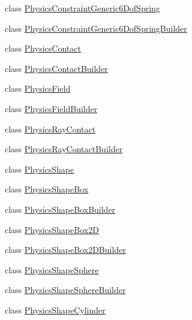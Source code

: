 \begin{DoxyCompactItemize}
\item 
class \mbox{\hyperlink{classnjli_1_1_world_factory_af32c447e4cf588410ecc1a6106157f9a}{Physics\+Constraint\+Generic6\+Dof\+Spring}}
\item 
class \mbox{\hyperlink{classnjli_1_1_world_factory_a933373e183ecd046f268e1b69038a02e}{Physics\+Constraint\+Generic6\+Dof\+Spring\+Builder}}
\item 
class \mbox{\hyperlink{classnjli_1_1_world_factory_af82a8eac76d39e47206a7eb1917e53f7}{Physics\+Contact}}
\item 
class \mbox{\hyperlink{classnjli_1_1_world_factory_aa61adc7648e4c29d071f44e17614316c}{Physics\+Contact\+Builder}}
\item 
class \mbox{\hyperlink{classnjli_1_1_world_factory_a8216afecc63791c1d19b902232c886b6}{Physics\+Field}}
\item 
class \mbox{\hyperlink{classnjli_1_1_world_factory_a09c097cb47fc1f3568d827cf0536b6ee}{Physics\+Field\+Builder}}
\item 
class \mbox{\hyperlink{classnjli_1_1_world_factory_a2fb3e6c99ae1c2204a36f0e83adab75e}{Physics\+Ray\+Contact}}
\item 
class \mbox{\hyperlink{classnjli_1_1_world_factory_a51efff0009aa2c9c621486a310037129}{Physics\+Ray\+Contact\+Builder}}
\item 
class \mbox{\hyperlink{classnjli_1_1_world_factory_a726223aef7972f289c4a01ccfd23d5ee}{Physics\+Shape}}
\item 
class \mbox{\hyperlink{classnjli_1_1_world_factory_aa594c185e502e1b87c998e01dd17a50f}{Physics\+Shape\+Box}}
\item 
class \mbox{\hyperlink{classnjli_1_1_world_factory_a32f571aedc28d4347ba0d3a2a9acc7fa}{Physics\+Shape\+Box\+Builder}}
\item 
class \mbox{\hyperlink{classnjli_1_1_world_factory_ae9fdb8cf9943dbfd76910301cb0ac1bc}{Physics\+Shape\+Box2D}}
\item 
class \mbox{\hyperlink{classnjli_1_1_world_factory_a9300c5f6d79ededa841d102672c1abed}{Physics\+Shape\+Box2\+D\+Builder}}
\item 
class \mbox{\hyperlink{classnjli_1_1_world_factory_aedad28d3885a187a21a94756dd00263c}{Physics\+Shape\+Sphere}}
\item 
class \mbox{\hyperlink{classnjli_1_1_world_factory_afc061546bfa689988558e8bb36979312}{Physics\+Shape\+Sphere\+Builder}}
\item 
class \mbox{\hyperlink{classnjli_1_1_world_factory_aa2e59a26c135fb52f13d19f1f09b6880}{Physics\+Shape\+Cylinder}}
\item 

\end{DoxyCompactItemize}
